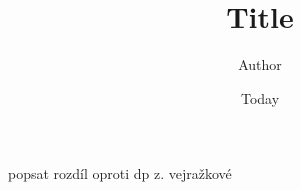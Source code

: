 \documentclass[]{article}
\begin{document}
\title{Title}
\author{Author}
\date{Today}
\maketitle

popsat rozdíl oproti dp z. vejražkové
\end{document}
